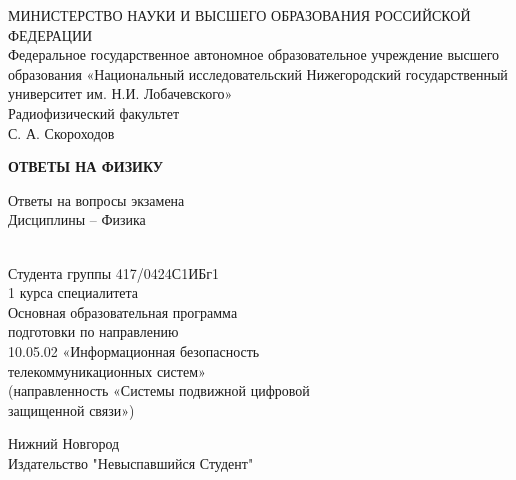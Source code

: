 
\begin{center}
	МИНИСТЕРСТВО НАУКИ И ВЫСШЕГО ОБРАЗОВАНИЯ РОССИЙСКОЙ
	ФЕДЕРАЦИИ\\

	\hfill \break
	Федеральное государственное автономное образовательное учреждение высшего образования «Национальный исследовательский Нижегородский государственный университет им. Н.И. Лобачевского» \\

	\hfill \break
	Радиофизический факультет\\
	\vspace{2.5cm}
	С. А. Скороходов\\
	\begin{center}
		\textbf{ОТВЕТЫ НА ФИЗИКУ}
	\end{center}
	\vspace{1cm}
	{Ответы на вопросы экзамена \\ Дисциплины -- Физика}\\
	\hfill \break
	\\
\end{center}

\vspace{0cm}

\begin{center}

	Студента группы 417/0424С1ИБг1\\
	1 курса специалитета\\
	\hfill \break
	Основная образовательная программа\\
	подготовки по направлению\\
	10.05.02 «Информационная безопасность\\
	телекоммуникационных систем»\\
	(направленность «Системы подвижной цифровой\\
	защищенной связи»)
\end{center}

\vfill
\begin{center} Нижний Новгород \\ Издательство "Невыспавшийся Студент" \\ \the\year{} \end{center}
\thispagestyle{empty}
\newpage
